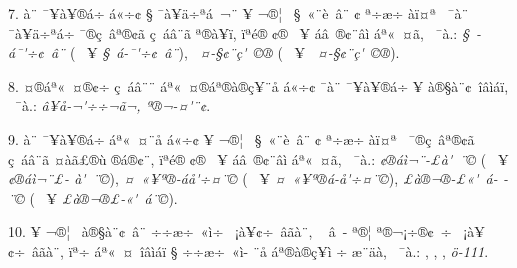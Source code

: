 \documentclass[12pt,twoside,a4paper]{article}
\begin{document}
7. ^^8f^^e0^^a8 ^^af^^a5^^e0^^a5^^ad^^ae^^e1^^f7 ^^e1^^ab^^f7^^a2 ^^a7 ^^af^^e0^^a5^^e4^^f7^^aa^^e1^^a0^^ac^^a8 ^^ad^^a5 ^^ac^^ae^^a6^^ad^^a0 ^^a7^^a0^^ab^^a8^^e8^^a0^^e2^^a8 \linebreak
^^a2 ^^aa^^f7^^ad^^e6^^f7 ^^e0^^ef^^a4^^aa^^a0 ^^af^^e0^^a8 ^^af^^e0^^a5^^e4^^f7^^aa^^e1^^f7 ^^af^^ae^^e7^^a0^^e2^^aa^^ae^^a2^^e3 ^^e7^^a0^^e1^^e2^^a8^^ad^^e3 ^^aa^^ae^^e0^^a5^^ad^^ef,\linebreak
^^ef^^aa^^e9^^ae ^^a2^^ae^^ad^^a0 ^^ad^^a5 ^^e1^^e2^^a0^^ad^^ae^^a2^^a8^^e2^^ec ^^e1^^aa^^ab^^a0^^a4^^e3, ^^ad^^a0^^af^^e0.: 
                         \emph{^^a7^^a0-^^e1^^af\'^^f7^^a2^^a0^^e2^^a8} (^^a0 ^^ad^^a5  \linebreak
\emph{^^a7^^a0^^e1-^^af\'^^f7^^a2^^a0^^e2^^a8}), \emph{^^ad^^a0^^a4-^^a7^^a2^^a8^^e7\'^^a0^^a9^^ad^^ae} 
(^^a0 ^^ad^^a5 \emph{^^ad^^a0^^a4-^^a7^^a2^^a8^^e7\'^^a0^^a9^^ad^^ae}).

8. ^^8e^^a4^^ad^^ae^^e1^^aa^^ab^^a0^^a4^^ae^^a2^^f7 ^^e7^^a0^^e1^^e2^^a8^^ad^^a8 ^^e1^^aa^^ab^^a0^^a4^^ad^^ae^^e1^^aa^^ae^^e0^^ae^^e7^^a5^^ad^^a8^^e5 ^^e1^^ab^^f7^^a2 ^^af^^e0^^a8 \linebreak
^^af^^a5^^e0^^a5^^ad^^ae^^e1^^f7 ^^ad^^a5 ^^e0^^ae^^a7^^e0^^a8^^a2^^a0^^ee^^e2^^ec^^e1^^ef, ^^ad^^a0^^af^^e0.:
\emph{^^e2^^a5^^e5-^^ac\'^^f7^^ad^^f7^^ac^^e3^^ac, ^^aa^^ae^^ac-^^a4\'^^a8^^a2}.

9. ^^8f^^e0^^a8 ^^af^^a5^^e0^^a5^^ad^^ae^^e1^^f7 ^^e1^^aa^^ab^^a0^^a4^^ad^^a8^^e5 ^^e1^^ab^^f7^^a2 ^^ad^^a5 ^^ac^^ae^^a6^^ad^^a0 ^^a7^^a0^^ab^^a8^^e8^^a0^^e2^^a8 ^^a2 \linebreak
^^aa^^f7^^ad^^e6^^f7 ^^e0^^ef^^a4^^aa^^a0 ^^af^^ae^^e7^^a0^^e2^^aa^^ae^^a2^^e3 ^^e7^^a0^^e1^^e2^^a8^^ad^^e3 ^^a4^^e0^^e3^^a3^^ae^^f9 ^^ae^^e1^^ad^^ae^^a2^^a8, ^^ef^^aa^^e9^^ae ^^a2^^ae^^ad^^a0 \linebreak
^^ad^^a5 ^^e1^^e2^^a0^^ad^^ae^^a2^^a8^^e2^^ec ^^e1^^aa^^ab^^a0^^a4^^e3, ^^ad^^a0^^af^^e0.:
          \emph{^^a2^^ae^^e1^^ec^^ac^^a8-^^a3^^e0\'^^a0^^ad^^ad^^a8^^a9} (^^a0 ^^ad^^a5 \emph{^^a2^^ae^^e1^^ec^^ac^^a8^^a3-\linebreak
^^e0\'^^a0^^ad^^ad^^a8^^a9}), \emph{^^a4^^a0^^ab^^a5^^aa^^ae-^^e1^^e5\'^^f7^^a4^^ad^^a8^^a9} (^^a0 ^^ad^^a5 \emph{^^a4^^a0^^ab^^a5^^aa^^ae^^e1-^^e5\'^^f7^^a4^^ad^^a8^^a9}),
                                 \emph{^^a3^^e0^^ae^^ac^^ae-^^a3^^ab\'^^a0^^e1-\linebreak
^^ad^^a8^^a9} (^^a0 ^^ad^^a5 \emph{^^a3^^e0^^ae^^ac^^ae^^a3-^^ab\'^^a0^^e1^^ad^^a8^^a9}).

10. ^^8d^^a5 ^^ac^^ae^^a6^^ad^^a0 ^^e0^^ae^^a7^^e0^^a8^^a2^^a0^^e2^^a8 ^^f7^^ad^^f7^^e6^^f7^^a0^^ab^^ec^^ad^^f7 ^^a0^^a1^^e0^^a5^^a2^^f7^^a0^^e2^^e3^^e0^^a8, ^^a0 ^^e2^^a0-\linebreak
^^aa^^ae^^a6 ^^aa^^ae^^ac^^a1^^f7^^ad^^ae^^a2^^a0^^ad^^f7 ^^a0^^a1^^e0^^a5^^a2^^f7^^a0^^e2^^e3^^e0^^a8, ^^ef^^aa^^f7 ^^e1^^aa^^ab^^a0^^a4^^a0^^ee^^e2^^ec^^e1^^ef ^^a7 ^^f7^^ad^^f7^^e6^^f7^^a0^^ab^^ec-\linebreak
^^ad^^a8^^e5 ^^e1^^aa^^ae^^e0^^ae^^e7^^a5^^ad^^ec ^^f7 ^^e6^^a8^^e4^^e0, ^^ad^^a0^^af^^e0.: 
\mbox{\emph{^^91^^90^^91^^90}}, \mbox{\emph{^^8a^^8f^^90^^91}}, \mbox{\emph{^^90^^92^^87}},
\mbox{\emph{^^87^^f6^^8b-111}}.
\end{document}
